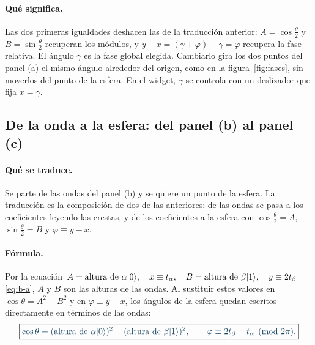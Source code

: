 \paragraph{Qué significa.}
Las dos primeras igualdades deshacen las de la traducción anterior: $A=\cos\frac\theta2$ y
$B=\sin\frac\theta2$ recuperan los módulos, y $y-x=(\gamma+\varphi)-\gamma=\varphi$ recupera la
fase relativa. El ángulo $\gamma$ es la fase global elegida. Cambiarlo gira los dos puntos del
panel (a) el mismo ángulo alrededor del origen, como en la figura~\ref{fig:fases}, sin moverlos
del punto de la esfera. En el widget, $\gamma$ se controla con un deslizador que fija
$x=\gamma$.

\subsection*{De la onda a la esfera: del panel (b) al panel (c)}

\paragraph{Qué se traduce.}
Se parte de las ondas del panel (b) y se quiere un punto de la esfera. La traducción es la
composición de dos de las anteriores: de las ondas se pasa a los coeficientes leyendo las
crestas, y de los coeficientes a la esfera con $\cos\frac\theta2=A$, $\sin\frac\theta2=B$ y
$\varphi\equiv y-x$.

\paragraph{Fórmula.}
Por la ecuación~$A=\text{altura de }\alpha\ket0,\quad\penalty0 x\equiv t_\alpha,\quad\penalty0 B=\text{altura de }\beta\ket1,\quad\penalty0 y\equiv 2t_\beta$ \eqref{eq:b-a}, $A$ y $B$ son las alturas de las ondas. Al sustituir estos valores en $\cos\theta=A^2-B^2$ y en
$\varphi\equiv y-x$, los ángulos de la esfera quedan escritos directamente en términos de las
ondas:
\begin{equation}\label{eq:b-c}
  \destacado{\cos\theta=(\text{altura de }\alpha\ket0)^2-(\text{altura de }\beta\ket1)^2,
  \qquad \varphi\equiv 2t_\beta-t_\alpha \pmod{2\pi}.}
\end{equation}


